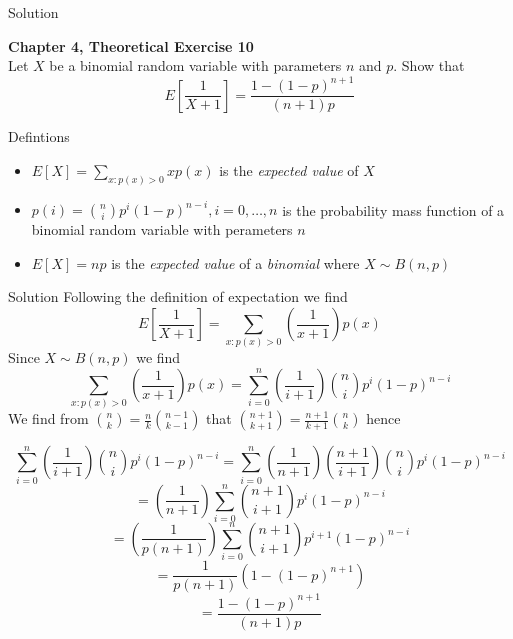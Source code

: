 \documentclass{article}
\begin{document}
\begin{spacing}{1.1}
\begin{homeworkProblem}
\begin{homeworkSection}{Solution}
  \end{homeworkSection}
\end{homeworkProblem}
\newpage
\begin{homeworkProblem}
  {\bf Chapter 4, Theoretical Exercise 10}\\
  Let $X$ be a binomial random variable with parameters $n$ and $p$. Show that 
  \[E\left[\frac{ 1}{ X + 1}\right] = \frac{ 1 - (1 - p)^{n + 1}}{ (n + 1)p}\]
  \begin{homeworkSection}{Defintions}
    \begin{itemize}
      \item $E[ X] = \sum\limits_{x:p( x) > 0}{ x p( x)}$ is the 
      \emph{expected value} of $X$
      \item $p( i) = {n \choose i} p^i (1 - p)^{n - i}, i = 0, \dots, n$ is the
      probability mass function of a binomial random variable with perameters $n$
      \item $E[ X] = n p$ is the \emph{expected value} of a \emph{binomial}
      where $X \sim B( n, p)$
    \end{itemize}
  \end{homeworkSection}
  \begin{homeworkSection}{Solution}
    Following the definition of expectation we find
    \[E \left[\frac{ 1}{ X + 1}\right] 
    = \sum\limits_{x:p(x) > 0}{ \left(\frac{ 1}{ x + 1}\right) p( x)}\]
    Since $X \sim B( n, p)$ we find
    \[\sum\limits_{x:p(x) > 0}{ \left(\frac{ 1}{ x + 1}\right) p( x)} 
    = \sum\limits_{i = 0}^{n}{ \left(\frac{ 1}{ i + 1}\right) {n \choose i} p^i (1 - p)^{n - i}}\]
    We find from ${n \choose k} = \frac{ n}{ k} {n - 1 \choose k - 1}$
    that ${n + 1\choose k + 1} = \frac{ n + 1}{ k + 1} {n \choose k}$
    hence
    
    \[\sum\limits_{i = 0}^{n}{ \left(\frac{ 1}{ i + 1}\right) {n \choose i} p^i (1 - p)^{n - i}}
    = \sum\limits_{i = 0}^{n}{ \left(\frac{ 1}{ n + 1}\right) \left(\frac{ n + 1}{ i + 1}\right) {n \choose i} p^i (1 - p)^{n - i}}\]
    \[= \left(\frac{ 1}{ n + 1}\right) \sum\limits_{i = 0}^{n}{ {n + 1 \choose i + 1} p^i (1 - p)^{n - i}}\]
    \[= \left(\frac{ 1}{ p (n + 1)}\right) \sum\limits_{i = 0}^{n}{ {n + 1 \choose i + 1} p^{i + 1} (1 - p)^{n - i}}\]
    \[= \frac{ 1}{ p (n + 1)} (1 - (1 - p)^{n + 1})\]
    \[= \frac{ 1 - (1 - p)^{n + 1}}{ (n + 1)p}\]
  \end{homeworkSection}
\end{homeworkProblem}


\end{spacing}
\end{document}
